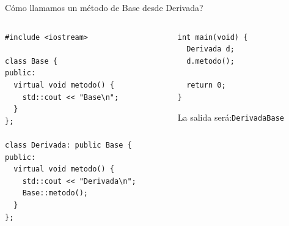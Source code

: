 \begin{frame}{\textquestiondown C\'omo llamamos un m\'etodo de Base desde Derivada?}
   \begin{columns}[t]
      \begin{column}{.6\linewidth}
         \begin{lstlisting}[style=normal,firstnumber=1]
#include <iostream>

class Base {
public:
  virtual void metodo() {
    std::cout << "Base\n";
  }
};

class Derivada: public Base {
public:
  virtual void metodo() {
    std::cout << "Derivada\n";
    Base::metodo();
  }
};

         \end{lstlisting}
      \end{column}
      \begin{column}{.4\linewidth}
         \begin{lstlisting}[style=normal,firstnumber=25]
int main(void) {
  Derivada d;
  d.metodo();

  return 0;
}
         \end{lstlisting}

      La salida ser\'a:\newline \texttt{Derivada\newline Base\newline}
      \end{column}
   \end{columns}
\end{frame}

